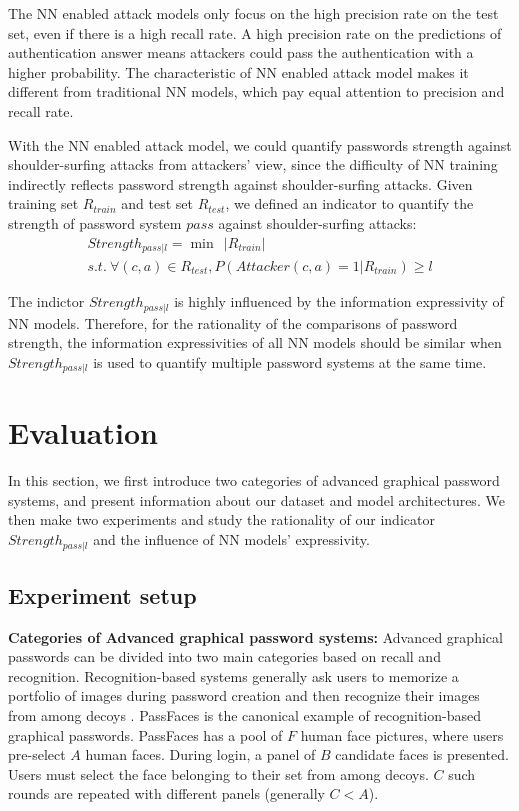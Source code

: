 \documentclass{article}
\begin{document}
  The NN enabled attack models only focus on the high precision rate on the test set, even if there is a high recall rate. 
  A high precision rate on the predictions of authentication answer means attackers could pass the authentication 
  with a higher probability. The characteristic of NN enabled attack model makes it different from traditional 
  NN models, which pay equal attention to precision and recall rate.
  
  With the NN enabled attack model, we could quantify passwords strength against shoulder-surfing attacks 
  from attackers' view, since the difficulty of NN training indirectly reflects password strength against 
  shoulder-surfing attacks.  Given training set $R_{train}$ and test set $R_{test}$, we defined an indicator 
  to quantify the strength of password system $pass$ against shoulder-surfing attacks:
  \begin{equation}
    \begin{gathered}
    Strength_{pass|l} = \mathop{\min}\ \ |R_{train}| \\
    s.t.\ 
    \forall (c,a) \in R_{test}, P(Attacker(c,a)=1|R_{train}) \geq l
    \end{gathered}
  \label{equa:indictor}
  \end{equation}
  
  The indictor $Strength_{pass|l}$ is highly influenced by the information expressivity of NN models. Therefore, for the 
  rationality of the comparisons of password strength, the information expressivities of all NN models should 
  be similar when $Strength_{pass|l}$ is used to quantify multiple password systems at the same time.
  \section{Evaluation}
  \label{sec:evaluation}
  In this section, we first introduce two categories of advanced graphical password systems, and present 
  information about our dataset and model architectures. We then make two experiments and study the 
  rationality of our indicator $Strength_{pass|l}$ and the influence of NN models' expressivity.
  \subsection{Experiment setup}
  \textbf{Categories of Advanced graphical password systems:}
  Advanced graphical passwords can be divided into two main categories based on recall and recognition. 
  Recognition-based systems generally ask users to memorize a portfolio of images during password creation and 
  then recognize their images from among decoys \cite{DBLP:journals/csur/BiddleCO12}. 
  PassFaces \cite{Passfaces} is the canonical example of recognition-based graphical passwords. PassFaces has a 
  pool of $F$ human face pictures, where users pre-select $A$ human faces. During login, a panel of $B$ 
  candidate faces is presented. Users must select the face belonging to their set from among decoys. $C$ such 
  rounds are repeated with different panels (generally $C < A$). 
  
\end{document}
